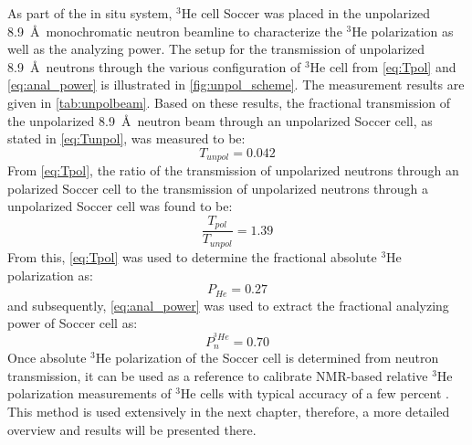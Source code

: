 
As part of the in situ system, $^3$He cell Soccer was placed in the unpolarized 8.9~\AA\ monochromatic neutron beamline to characterize the $^3$He polarization as well as the analyzing power. The setup for the transmission of unpolarized 8.9~\AA\ neutrons through the various configuration of $^3$He cell from \cref{eq:Tpol} and \cref{eq:anal_power} is illustrated in \cref{fig:unpol_scheme}. The measurement results are given in \cref{tab:unpolbeam}. Based on these results, the fractional transmission of the unpolarized 8.9~\AA\ neutron beam through an unpolarized Soccer cell, as stated in \cref{eq:Tunpol}, was measured to be:
\begin{equation}
    T_{unpol} = 0.042
\end{equation}
From \cref{eq:Tpol}, the ratio of the transmission of unpolarized neutrons through an polarized Soccer cell to the transmission of unpolarized neutrons through a unpolarized Soccer cell was found to be:
\begin{equation}
    \frac{T_{pol}}{T_{unpol}} = 1.39
\end{equation}
From this, \cref{eq:Tpol} was used to determine the fractional absolute $^3$He polarization as:
\begin{equation}
    P_{He} = 0.27
\end{equation}
and subsequently, \cref{eq:anal_power} was used to extract the fractional analyzing power of Soccer cell as:
\begin{equation}
    P_n^{^3He} = 0.70
\end{equation}
Once absolute $^3$He polarization of the Soccer cell is determined from neutron transmission, it can be used as a reference to calibrate NMR-based relative $^3$He polarization measurements of $^3$He cells with typical accuracy of a few percent \cite{Chen2011}. This method is used extensively in the next chapter, therefore, a more detailed overview and results will be presented there.

